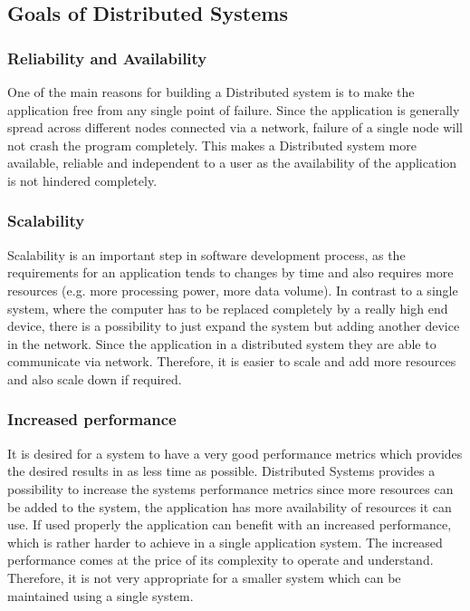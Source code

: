     \subsection{Goals of Distributed Systems} 
        \subsubsection{Reliability and Availability}
        One of the main reasons for building a Distributed system is to make the application free from any single point of failure.
        Since the application is generally spread across different nodes connected via a network, failure of a single node will not 
        crash the program completely. This makes a Distributed system more available, reliable and independent to a user as the availability
        of the application is not hindered completely.
        
        \subsubsection{Scalability}
        Scalability is an important step in software development process, as the requirements for an application tends to changes by time and also requires more resources
        (e.g. more processing power, more data volume). 
        In contrast to a single system, where the computer 
        has to be replaced completely by a really high end device, there is a possibility to just expand the system but adding another device in the network.
        Since the application in a distributed system they are able to communicate via network. Therefore, it is easier to scale and add more resources and 
        also scale down if required. 

        \subsubsection{Increased performance}
        It is desired for a system to have a very good performance metrics which provides the desired results in as less time as possible.
        Distributed Systems provides a possibility to increase the systems performance metrics since more resources can be added to the system,
        the application has more availability of resources it can use. If used properly the application can benefit with an increased performance, 
        which is rather harder to achieve in a single application system. The increased performance comes at the price of its complexity to operate and understand.
        Therefore, it is not very appropriate for a smaller system which can be maintained using a single system.
    
